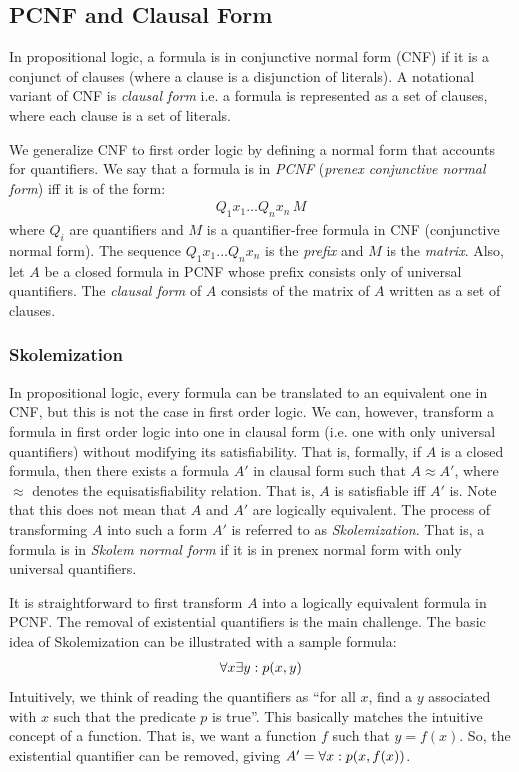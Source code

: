 \documentclass[10pt]{article}
\begin{document}
\subsection{PCNF and Clausal Form}

In propositional logic, a formula is in conjunctive normal form (CNF) if it is a conjunct of clauses (where a clause is a disjunction of literals). A notational variant of CNF is \textit{clausal form} i.e. a formula is represented as a set of clauses, where each clause is a set of literals.

We generalize CNF to first order logic by defining a normal form that accounts for quantifiers. We say that a formula is in \textit{PCNF} (\textit{prenex conjunctive normal form}) iff it is of the form:
\begin{align*}
    Q_1 x_1 \dots Q_n x_n \, M
\end{align*}
where $Q_i$ are quantifiers and $M$ is a quantifier-free formula in CNF (conjunctive normal form). The sequence $Q_1 x_1\dots Q_n x_n$ is the \textit{prefix} and $M$ is the \textit{matrix}. Also, let $A$ be a closed formula in PCNF whose prefix consists only of universal quantifiers. The \textit{clausal form} of $A$ consists of the matrix of $A$ written as a set of clauses.

\subsubsection{Skolemization}

In propositional logic, every formula can be translated to an equivalent one in CNF, but this is not the case in first order logic. We can, however, transform a formula in first order logic into one in clausal form (i.e. one with only universal quantifiers) without modifying its satisfiability. That is, formally, if $A$ is a closed formula, then there exists a formula $A'$ in clausal form such that $A \approx A'$, where $\approx$ denotes the equisatisfiability relation. That is, $A$ is satisfiable iff $A'$ is. Note that this does not mean that $A$ and $A'$ are logically equivalent. The process of transforming $A$ into such a form $A'$ is referred to as \textit{Skolemization}. That is, a formula is in \textit{Skolem normal form} if it is in prenex normal form with only universal quantifiers.

It is straightforward to first transform $A$ into a logically equivalent formula in PCNF. The removal of existential quantifiers is the main challenge. The basic idea of Skolemization can be illustrated with a sample formula:
\begin{align*}
    \forall x \exists y : p(x,y)
\end{align*}
Intuitively, we think of reading the quantifiers as ``for all $x$, find a $y$ associated with $x$ such that the predicate $p$ is true''. This basically matches the intuitive concept of a function. That is, we want a function $f$ such that $y=f(x)$. So, the existential quantifier can be removed, giving $A' = \forall x : p(x,f(x))$.
\end{document}
